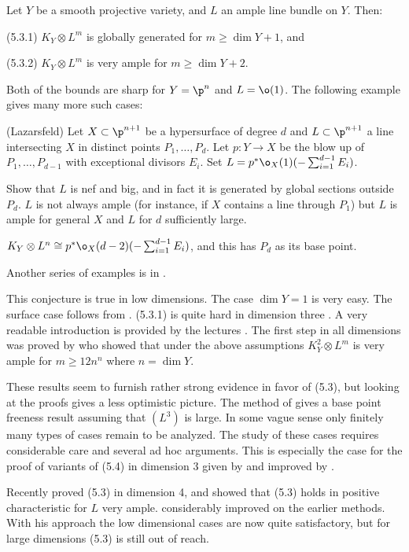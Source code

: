   Let $Y$ be a  smooth projective variety,
  and $L$ an ample line bundle on $Y$.
Then:

(5.3.1)  $K_Y\otimes L^m$ is globally generated for $m\geq \dim Y+1$, and

(5.3.2)  $K_Y\otimes L^m$ is very ample for $m\geq \dim Y+2$.
\endproclaim

Both of the bounds are sharp for $Y=\p^n$ and $L=\o(1)$. The following example
gives many more  such cases:


 (Lazarsfeld)  Let $X\subset \p^{n+1}$ be a hypersurface of
degree $d$ and $L\subset \p^{n+1}$   a line intersecting $X$ in distinct
points
$P_1,\dots,P_d$. Let $p:Y\to X$ be the blow up of $P_1,\dots,P_{d-1}$
with exceptional divisors $E_i$. Set $L=p^*\o_X(1)(-\sum_{i=1}^{d-1}E_i)$. 

Show that $L$ is nef and big, and in fact it is generated by global sections
outside $P_d$.  $L$ is not always ample (for instance, if $X$ contains a line
through $P_1$) but $L$ is ample for general $X$ and $L$ for  $d$ sufficiently
large. 

$K_Y\otimes L^n\cong p^*\o_X(d-2)(-\sum_{i=1}^{d-1}E_i)$, and this has $P_d$ as its
base point. 

Another series of examples is in \cite{Kawachi96}. 
\enddemo

 This conjecture is true in low dimensions. The case $\dim Y=1$  
is very easy. The surface case follows from  \cite{Reider88}. (5.3.1) is quite
hard in dimension three 
\cite{Ein-Lazarsfeld93}. 
A very readable introduction is provided by the lectures \cite{Lazarsfeld96}.
The first step in all dimensions  was proved by \cite{Demailly93} who showed
that under the above assumptions $K_Y^2\otimes L^m$ is very ample for $m\geq
12n^n$ where
$n=\dim Y$.


 These results seem to furnish rather strong evidence in
favor of (5.3), but looking at the proofs gives a less optimistic picture.
The method of \cite{Ein-Lazarsfeld93}  gives a  base point freeness result
assuming that $(L^3)$ is large. In some vague sense only finitely many types of
cases remain to be analyzed. The study of these cases  
 requires considerable care and several ad hoc arguments. This is especially
the case for the proof of variants of (5.4) in dimension 3 given by 
\cite{Ein-Lazarsfeld93} and improved by 
\cite{Fujita94}.

Recently \cite{Kawamata96} proved (5.3) in dimension 4, and \cite{Smith95}
showed that (5.3) holds in positive characteristic for $L$ very ample. 
\cite{Helmke96} considerably improved on the earlier methods. With his
approach the low dimensional cases are now quite satisfactory, but for large
dimensions (5.3) is still out of reach.
\enddemo




